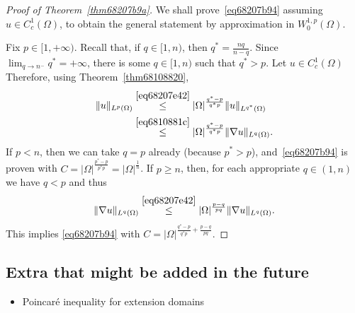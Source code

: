\documentclass[a4paper,9pt]{amsart}
\newcommand{\N}{\mathbb{N}}	%
\newcommand{\grad}{\nabla}
\newcommand{\TODO}{{\bf\color{Red}TODO}}
\theoremstyle{plain}
\theoremstyle{definition}
\theoremstyle{remark}
\begin{document}
\begin{proof}[Proof of Theorem~\ref{thm68207b9a}]
	We shall prove~\eqref{eq68207b94} assuming $u\in C^1_c(\Omega)$, to obtain the general statement by approximation in $W^{1,p}_0(\Omega)$.

	Fix $p\in[1,+\infty)$.
	Recall that, if $q\in[1,n)$, then $q^* = \frac{nq}{n-q}$.
%	
	Since $\lim_{q\to n^-} q^* = +\infty$, there is some $q\in[1,n)$ such that $q^*>p$.
	Let $u\in C^1_c(\Omega)$
	Therefore, using Theorem~\ref{thm68108820},
	\begin{align}
		\|u\|_{L^p(\Omega)}
		&\overset{\eqref{eq68207e42}}\le |\Omega|^{\frac{q^*-p}{q^*p}} \|u\|_{L^{q^*}(\Omega)} \\
		&\overset{\eqref{eq6810881c}}\le |\Omega|^{\frac{q^*-p}{q^*p}} \| \grad u\|_{L^q(\Omega)} .
	\end{align}
	If $p<n$, then we can take $q=p$ already (because $p^*>p$), and~\eqref{eq68207b94} is proven with $C=|\Omega|^{\frac{p^*-p}{p^*p}} = |\Omega|^{\frac1n}$.
	If $p\ge n$, then, for each appropriate $q\in(1,n)$ we have $q<p$ and thus
	\begin{equation}
		\| \grad u\|_{L^q(\Omega)} 
		\overset{\eqref{eq68207e42}}\le |\Omega|^{\frac{p-q}{pq}} \| \grad u\|_{L^q(\Omega)} .
	\end{equation}
	This implies \eqref{eq68207b94} with $C= |\Omega|^{\frac{q^*-p}{q^*p}+\frac{p-q}{pq}}$.
\end{proof}

\subsection{Extra that might be added in the future}
\begin{itemize}
\item Poincaré inequality for extension domains
\end{itemize}


\newpage
\end{document}
